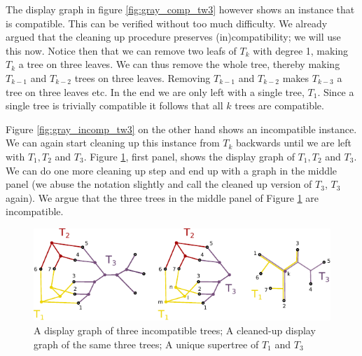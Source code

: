 The display graph in figure \ref{fig:gray_comp_tw3} however shows an instance that is compatible. This can be verified without too much difficulty. We already argued that the cleaning up procedure preserves (in)compatibility; we will use this now. Notice then that we can remove two leafs of $T_k$ with degree 1, making $T_k$ a tree on three leaves. We can thus remove the whole tree, thereby making $T_{k-1}$ and $T_{k-2}$ trees on three leaves. Removing $T_{k-1}$ and $T_{k-2}$ makes $T_{k-3}$ a tree on three leaves etc. In the end we are only left with a single tree, $T_1$. Since a single tree is trivially compatible it follows that all $k$ trees are compatible. 


Figure \ref{fig:gray_incomp_tw3} on the other hand shows an incompatible instance. We can again start cleaning up this instance from $T_k$ backwards until we are left with $T_1, T_2$ and $T_3$. Figure \ref{fig:3_incomp}, first panel, shows the display graph of $T_1, T_2$ and $T_3$. We can do one more cleaning up step and end up with a graph in the middle panel (we abuse the notation slightly and call the cleaned up version of $T_3$, $T_3$ again). We argue that the three trees in the middle panel of Figure \ref{fig:3_incomp} are incompatible. 

\begin{figure}[h]
	\centering
		\includegraphics[width=0.9 \textwidth]{../figs/ch5/3_incomp_trees.pdf}
		\caption{A display graph of three incompatible trees; A cleaned-up display graph of the same three trees; A unique supertree of $T_1$ and $T_3$}
		\label{fig:3_incomp}
\end{figure}

